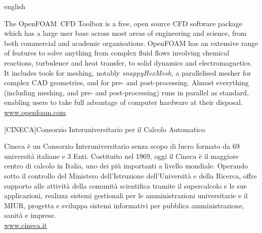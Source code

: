 \begin{acronym}[OpenFOAM]
\begin{otherlanguage*}{english}
{\smaller The OpenFOAM\textregistered\ CFD Toolbox is a free, open source CFD software package which has a large user base across most areas of engineering and science, from both commercial and academic organisations. OpenFOAM has an extensive range of features to solve anything from complex fluid flows involving chemical reactions, turbulence and heat transfer, to solid dynamics and electromagnetics. It includes tools for meshing, notably \emph{snappyHexMesh}, a parallelised mesher for complex CAD geometries, and for pre- and post-processing. Almost everything (including meshing, and pre- and post-processing) runs in parallel as standard, enabling users to take full advantage of computer hardware at their disposal.\\
\href{http://www.openfoam.com/}{www.openfoam.com}
\par}
%
\end{otherlanguage*}
%
%
[CINECA]{Consorzio Interuniversitario per il Calcolo Automatico}

{\smaller Cineca è un Consorzio Interuniversitario senza scopo di lucro formato da 69 università italiane e 3 Enti. Costituito nel 1969, oggi il Cineca è il maggiore centro di calcolo in Italia, uno dei più importanti a livello mondiale. Operando sotto il controllo del Ministero dell'Istruzione dell'Università e della Ricerca, offre supporto alle attività della comunità scientifica tramite il supercalcolo e le sue applicazioni, realizza sistemi gestionali per le amministrazioni universitarie e il MIUR, progetta e sviluppa sistemi informativi per pubblica amministrazione, sanità e imprese.\\
\href{http://www.cineca.it/}{www.cineca.it}
\par}
%
%
\end{acronym}
%
